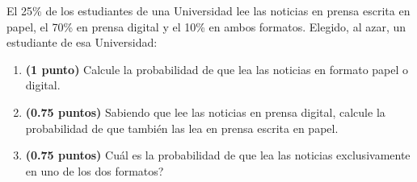 
El 25\% de los estudiantes de una Universidad lee las noticias en prensa escrita en papel, el 70\% en prensa digital y el 10\% en ambos formatos. Elegido, al azar, un estudiante de esa Universidad:
\begin{enumerate}[label=\alph*)]
\item \textbf{(1 punto)} Calcule la probabilidad de que lea las noticias en formato papel o digital.
\item \textbf{(0.75 puntos)} Sabiendo que lee las noticias en prensa digital, calcule la probabilidad de que también las lea en prensa escrita en papel.
\item \textbf{(0.75 puntos)} \textquestiondown{}Cuál es la probabilidad de que lea las noticias exclusivamente en uno de los dos formatos?
\end{enumerate}
